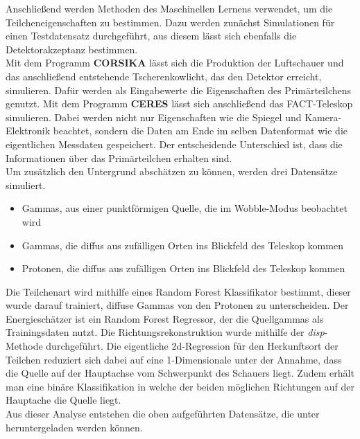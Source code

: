 Anschließend werden Methoden des Maschinellen Lernens verwendet, um die Teilcheneigenschaften zu bestimmen. Dazu werden zunächst Simulationen für einen Testdatensatz durchgeführt, aus diesem lässt sich ebenfalls die Detektorakzeptanz bestimmen. \\
Mit dem Programm \textbf{CORSIKA} \cite{1998cmcc.book.....H} lässt sich die Produktion der Luftschauer und das anschließend entstehende Tscherenkowlicht, das den Detektor erreicht, simulieren. Dafür werden als Eingabewerte die Eigenschaften des Primärteilchens genutzt. Mit dem Programm \textbf{CERES} lässt sich anschließend das FACT-Teleskop simulieren. Dabei werden nicht nur Eigenschaften wie die Spiegel und Kamera-Elektronik beachtet, sondern die Daten am Ende im selben Datenformat wie die eigentlichen Messdaten gespeichert. Der entscheidende Unterschied ist, dass die Informationen über das Primärteilchen erhalten sind.\\
Um zusätzlich den Untergrund abschätzen zu können, werden drei Datensätze simuliert.
\begin{itemize}
	\item Gammas, aus einer punktförmigen Quelle, die im Wobble-Modus beobachtet wird
	\item Gammas, die diffus aus zufälligen Orten ins Blickfeld des Teleskop kommen
	\item Protonen, die diffus aus zufälligen Orten ins Blickfeld des Teleskop kommen
\end{itemize}
Die Teilchenart wird mithilfe eines Random Forest Klassifikator bestimmt, dieser wurde darauf trainiert, diffuse Gammas von den Protonen zu unterscheiden. Der Energieschätzer ist ein Random Forest Regressor, der die Quellgammas als Trainingsdaten nutzt. Die Richtungsrekonstruktion wurde mithilfe der \textit{disp}-Methode durchgeführt. Die eigentliche 2d-Regression für den Herkunftsort der Teilchen reduziert sich dabei auf eine 1-Dimensionale unter der Annahme, dass die Quelle auf der Hauptachse vom Schwerpunkt des Schauers liegt. Zudem erhält man eine binäre Klassifikation in welche der beiden möglichen Richtungen auf der Hauptache die Quelle liegt.\\
Aus dieser Analyse entstehen die oben aufgeführten Datensätze, die unter \cite{FACTdata} heruntergeladen werden können.
